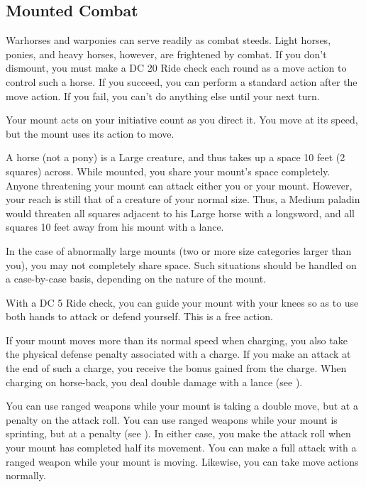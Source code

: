 \subsection{Mounted Combat}\label{Mounted Combat}
 Warhorses and warponies can serve readily as combat steeds. Light horses, ponies, and heavy horses, however, are frightened by combat. If you don't dismount, you must make a DC 20 Ride check each round as a move action to control such a horse. If you succeed, you can perform a standard action after the move action. If you fail, you can't do anything else until your next turn.

Your mount acts on your initiative count as you direct it. You move at its speed, but the mount uses its action to move.

 A horse (not a pony) is a Large creature, and thus takes up a space 10 feet (2 squares) across. While mounted, you share your mount's space completely. Anyone threatening your mount can attack either you or your mount. However, your reach is still that of a creature of your normal size. Thus, a Medium paladin would threaten all squares adjacent to his Large horse with a longsword, and all squares 10 feet away from his mount with a lance.

In the case of abnormally large mounts (two or more size categories larger than you), you may not completely share space. Such situations should be handled on a case-by-case basis, depending on the nature of the mount.

 With a DC 5 Ride check, you can guide your mount with your knees so as to use both hands to attack or defend yourself. This is a free action.

If your mount moves more than its normal speed when charging, you also take the physical defense penalty associated with a charge. If you make an attack at the end of such a charge, you receive the bonus gained from the charge. When charging on horse-back, you deal double damage with a lance (see ).

You can use ranged weapons while your mount is taking a double move, but at a  penalty on the attack roll. You can use ranged weapons while your mount is sprinting, but at a  penalty (see ). In either case, you make the attack roll when your mount has completed half its movement. You can make a full attack with a ranged weapon while your mount is moving. Likewise, you can take move actions normally.

